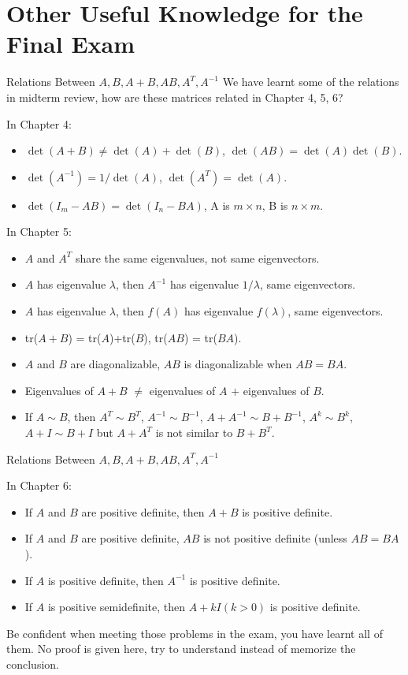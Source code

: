 \documentclass{beamer}
\begin{document}
\section{Other Useful Knowledge for the Final Exam}
\begin{frame}{Relations Between $A, B, A+B, AB, A^T, A^{-1}$}
We have learnt some of the relations in midterm review, how are these matrices related in Chapter 4, 5, 6?

\vspace{3pt}
In Chapter 4:
\begin{itemize}
    \item $\det(A+B) \ne \det(A)+\det(B)$, $\det(AB) = \det(A) \det(B)$.
    \item $\det(A^{-1}) = 1/ \det(A)$, $\det(A^T) = \det(A)$.
    \item $\det(I_m-AB) = \det(I_n-BA)$, A is $m \times n$, B is $n \times m$.
\end{itemize}

In Chapter 5:
\begin{itemize}
    \item $A$ and $A^T$ share the same eigenvalues, not same eigenvectors.
    \item $A$ has eigenvalue $\lambda$, then $A^{-1}$ has eigenvalue $1/\lambda$, same eigenvectors.
    \item $A$ has eigenvalue $\lambda$, then $f(A)$ has eigenvalue $f(\lambda)$, same eigenvectors.
    \item tr($A+B$) = tr($A$)+tr($B$), tr($AB$) = tr($BA$).
    \item $A$ and $B$ are diagonalizable, $AB$ is diagonalizable when $AB=BA$.
    \item Eigenvalues of $A+B$ $\ne$ eigenvalues of $A$ $+$ eigenvalues of $B$.
    \item If $A\sim B$, then $A^T\sim B^T$, $A^{-1}\sim B^{-1}$, $A+A^{-1}\sim B+B^{-1}$, $A^{k}\sim B^{k}$, $A+I\sim B+I$ but $A+A^T$ is not similar to $ B+B^T$.
\end{itemize}
\end{frame}

\begin{frame}{Relations Between $A, B, A+B, AB, A^T, A^{-1}$}

In Chapter 6:
\begin{itemize}
    \item If $A$ and $B$ are positive definite, then $A+B$ is positive definite.
    \item If $A$ and $B$ are positive definite, $AB$ is not positive definite (unless $AB=BA$).
    \item If $A$ is positive definite, then $A^{-1}$ is positive definite.
    \item If $A$ is positive semidefinite, then $A+kI(k>0)$ is positive definite.
\end{itemize}

\vspace{5pt}
Be confident when meeting those problems in the exam, you have learnt all of them. No proof is given here, try to understand instead of memorize the conclusion.

\end{frame}
\end{document}
